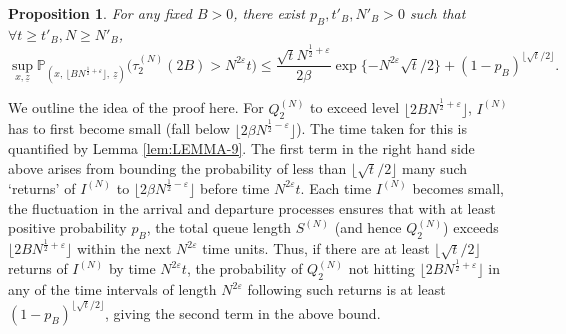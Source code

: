 \documentclass[11pt, reqno]{article}
\newtheorem{prop}[theorem]{Proposition}
\numberwithin{equation}{section}
\numberwithin{theorem}{section}
\newcommand\blue[1]{#1}
\begin{document}
\begin{prop}\label{prop:UPCROSS}
For any fixed $B > 0$,  there exist $p_B, t'_B, N'_B>0$ such that $\forall t\geq t'_B, N\geq N'_B$,
\begin{equation*}
    \blue{\sup_{x,\underline{z}}\mathbb{P}_{(x, \, \lfloor BN^{\frac{1}{2}+\varepsilon} \rfloor, \,\underline{z})}\big(\tau^{(N)}_2(2B)>N^{2\varepsilon}t\big)\leq \frac{\sqrt{t} N^{\frac{1}{2}+\varepsilon}}{2\beta} \exp \{-N^{2\varepsilon}\sqrt{t}/2\}+(1-p_B)^{\lfloor\sqrt{t}/2\rfloor}.}
\end{equation*}
\end{prop}
\blue{We outline the idea of the proof here. For $Q_2^{(N)}$ to exceed level $\lfloor 2B N^{\frac{1}{2}+\varepsilon}\rfloor$, $I^{(N)}$ has to first become small (fall below $\lfloor 2\beta N^{\frac{1}{2}-\varepsilon}\rfloor$). The time taken for this is quantified by Lemma \ref{lem:LEMMA-9}. The first term in the right hand side above arises from bounding the probability of less than $\lfloor\sqrt{t}/2\rfloor$ many such `returns' of $I^{(N)}$ to $\lfloor 2\beta N^{\frac{1}{2}-\varepsilon}\rfloor$ before time $N^{2\varepsilon}t$. Each time $I^{(N)}$ becomes small, the fluctuation in the arrival and departure processes ensures that with at least positive probability $p_B$, the total queue length $S^{(N)}$ (and hence $Q_2^{(N)}$) exceeds $\lfloor 2B N^{\frac{1}{2}+\varepsilon}\rfloor$ within the next $N^{2\varepsilon}$ time units. Thus, if there are at least $\lfloor\sqrt{t}/2\rfloor$ returns of $I^{(N)}$ by time $N^{2\varepsilon}t$, the probability of $Q_2^{(N)}$ not hitting $\lfloor 2B N^{\frac{1}{2}+\varepsilon}\rfloor$ in any of the time intervals of length $N^{2\varepsilon}$ following such returns is at least $(1-p_B)^{\lfloor\sqrt{t}/2\rfloor}$, giving the second term in the above bound.}
\end{document}
